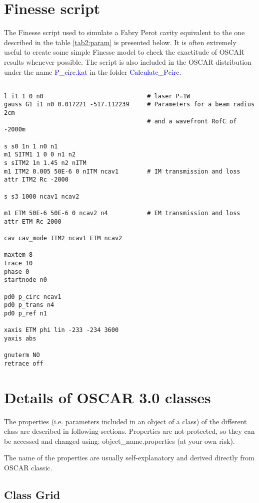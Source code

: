 \chapter{Finesse script}
\label{chaB}

The Finesse script \cite{Finesse} used to simulate a Fabry Perot cavity equivalent to the one described in the table \ref{tab2:param} is presented below. It is often extremely useful to create some simple Finesse model to check the exactitude of OSCAR results whenever possible. The script is also included in the OSCAR distribution under the name \textcolor{blue}{P\_circ.kat} in the folder \textcolor{blue}{Calculate\_Pcirc}.

\begin{verbatim}

l i1 1 0 n0                             # laser P=1W
gauss G1 i1 n0 0.017221 -517.112239     # Parameters for a beam radius 2cm
                                        # and a wavefront RofC of -2000m

s s0 1n 1 n0 n1
m1 SITM1 1 0 0 n1 n2
s sITM2 1n 1.45 n2 nITM
m1 ITM2 0.005 50E-6 0 nITM ncav1        # IM transmission and loss
attr ITM2 Rc -2000

s s3 1000 ncav1 ncav2

m1 ETM 50E-6 50E-6 0 ncav2 n4           # EM transmission and loss
attr ETM Rc 2000

cav cav_mode ITM2 ncav1 ETM ncav2

maxtem 8
trace 10
phase 0
startnode n0

pd0 p_circ ncav1
pd0 p_trans n4
pd0 p_ref n1

xaxis ETM phi lin -233 -234 3600
yaxis abs

gnuterm NO
retrace off

\end{verbatim}


\chapter{Details of OSCAR 3.0 classes}
The properties (i.e. parameters included in an object of a class) of the different class are described in following sections. Properties are not protected, so they can be accessed and changed using: object\_name.properties (at your own risk).

The name of the properties are usually self-explanatory and derived directly from OSCAR classic.

\section{Class Grid}

